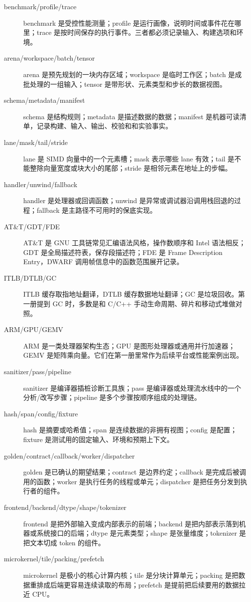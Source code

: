 \begin{description}
  \item[benchmark/profile/trace] benchmark 是受控性能测量；profile 是运行画像，说明时间或事件花在哪里；trace 是按时间保存的执行事件。三者都必须记录输入、构建选项和环境。
  \item[arena/workspace/batch/tensor] arena 是预先规划的一块内存区域；workspace 是临时工作区；batch 是成批处理的一组输入；tensor 是带形状、元素类型和步长的数据视图。
  \item[schema/metadata/manifest] schema 是结构规则；metadata 是描述数据的数据；manifest 是机器可读清单，记录构建、输入、输出、校验和和实验事实。
  \item[lane/mask/tail/stride] lane 是 SIMD 向量中的一个元素槽；mask 表示哪些 lane 有效；tail 是不能整除向量宽度或块大小的尾部；stride 是相邻元素在地址上的步幅。
  \item[handler/unwind/fallback] handler 是处理器或回调函数；unwind 是异常或调试器沿调用栈回退的过程；fallback 是主路径不可用时的保底实现。
  \item[AT\&T/GDT/FDE] AT\&T 是 GNU 工具链常见汇编语法风格，操作数顺序和 Intel 语法相反；GDT 是全局描述符表，保存段描述符；FDE 是 Frame Description Entry，DWARF 调用帧信息中的函数范围展开记录。
  \item[ITLB/DTLB/GC] ITLB 缓存取指地址翻译，DTLB 缓存数据地址翻译；GC 是垃圾回收。第一册提到 GC 时，多数是和 C/C++ 手动生命周期、碎片和移动式堆做对照。
  \item[ARM/GPU/GEMV] ARM 是一类处理器架构生态；GPU 是图形处理器或通用并行加速器；GEMV 是矩阵乘向量。它们在第一册里常作为后续平台或性能案例出现。
  \item[sanitizer/pass/pipeline] sanitizer 是编译器插桩诊断工具族；pass 是编译器或处理流水线中的一个分析/改写步骤；pipeline 是多个步骤按顺序组成的处理链。
  \item[hash/span/config/fixture] hash 是摘要或哈希值；span 是连续数据的非拥有视图；config 是配置；fixture 是测试用的固定输入、环境和预期上下文。
  \item[golden/contract/callback/worker/dispatcher] golden 是已确认的期望结果；contract 是边界约定；callback 是完成后被调用的函数；worker 是执行任务的线程或单元；dispatcher 是把任务分发到执行者的组件。
  \item[frontend/backend/dtype/shape/tokenizer] frontend 是把外部输入变成内部表示的前端；backend 是把内部表示落到机器或系统接口的后端；dtype 是元素类型；shape 是张量维度；tokenizer 是把文本切成 token 的组件。
  \item[microkernel/tile/packing/prefetch] microkernel 是极小的核心计算内核；tile 是分块计算单元；packing 是把数据重排成后端更容易连续读取的布局；prefetch 是提前把后续要用的数据拉近 CPU。

\end{description}
